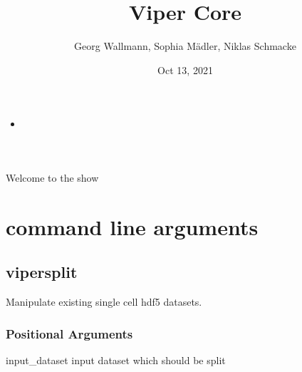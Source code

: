 \documentclass[letterpaper,10pt,english]{sphinxmanual}
\title{Viper Core}
\date{Oct 13, 2021}
\author{Georg Wallmann, Sophia Mädler, Niklas Schmacke}
\begin{document}
\pagestyle{empty}
\sphinxmaketitle
\pagestyle{plain}
\sphinxtableofcontents
\pagestyle{normal}
\label{\detokenize{index::doc}}


\begin{sphinxShadowBox}
\begin{itemize}
\item {} 
\sphinxAtStartPar
{}\label{\detokenize{index:id1}}{\hyperref[\detokenize{index:welcome-to-viper-core-s-documentation}]{}}

\end{itemize}
\end{sphinxShadowBox}

\sphinxAtStartPar
Welcome to the show


\chapter{command line arguments}
\label{\detokenize{pages/vipercmd:command-line-arguments}}\label{\detokenize{pages/vipercmd::doc}}

\section{viper\sphinxhyphen{}split}
\label{\detokenize{pages/vipercmd:viper-split}}
\sphinxAtStartPar

\sphinxAtStartPar
Manipulate existing single cell hdf5 datasets.


\begin{sphinxVerbatim}[commandchars=\\\{\}]
  \PYG{p}{[}\PYG{p}{]} \PYG{p}{[}  \PYG{p}{]} \PYG{p}{[}\PYG{p}{]} \PYG{p}{[} \PYG{p}{]} \PYG{p}{[}\PYG{p}{]} 
\end{sphinxVerbatim}


\subsection{Positional Arguments}
\label{\detokenize{pages/vipercmd:Positional Arguments}}\begin{optionlist}{3cm}
\item [input\_dataset]  
\sphinxAtStartPar
input dataset which should be split
\end{optionlist}
\end{document}
